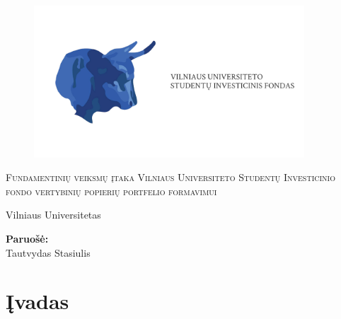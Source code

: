 \documentclass[12pt]{article}
\begin{document}
\begin{titlepage}
\begin{figure}[t]
   \centering\includegraphics[width=0.9\textwidth]{logo}
\end{figure}
\begin{center}
    \textsc{ \LARGE{Fundamentinių veiksmų įtaka Vilniaus Universiteto Studentų Investicinio fondo vertybinių popierių portfelio formavimui \\}}

	\vspace{30mm}
	\fontsize{7mm}{7mm}\selectfont 
    \textup{Vilniaus Universitetas}\\
\end{center}

\vspace{50mm}

\begin{minipage}[t]{1\textwidth}
	\flushright\textnormal{\large{\bf Paruošė:\\}}
	{\large Tautvydas Stasiulis}
\end{minipage}

\vspace{20mm}


\end{titlepage}


\tableofcontents
\newpage
\section{Įvadas}
\end{document}
